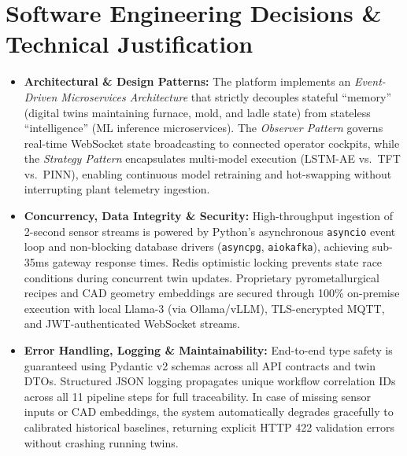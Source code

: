 \documentclass[11pt, a4paper]{article}
\begin{document}
\section{Software Engineering Decisions \& Technical Justification}
\begin{itemize}[noitemsep, topsep=2pt]
    \item \textbf{Architectural \& Design Patterns:} The platform implements an \textit{Event-Driven Microservices Architecture} that strictly decouples stateful ``memory'' (digital twins maintaining furnace, mold, and ladle state) from stateless ``intelligence'' (ML inference microservices). The \textit{Observer Pattern} governs real-time WebSocket state broadcasting to connected operator cockpits, while the \textit{Strategy Pattern} encapsulates multi-model execution (LSTM-AE vs.\ TFT vs.\ PINN), enabling continuous model retraining and hot-swapping without interrupting plant telemetry ingestion.
    \item \textbf{Concurrency, Data Integrity \& Security:} High-throughput ingestion of 2-second sensor streams is powered by Python's asynchronous \texttt{asyncio} event loop and non-blocking database drivers (\texttt{asyncpg}, \texttt{aiokafka}), achieving sub-35ms gateway response times. Redis optimistic locking prevents state race conditions during concurrent twin updates. Proprietary pyrometallurgical recipes and CAD geometry embeddings are secured through 100\% on-premise execution with local Llama-3 (via Ollama/vLLM), TLS-encrypted MQTT, and JWT-authenticated WebSocket streams.
    \item \textbf{Error Handling, Logging \& Maintainability:} End-to-end type safety is guaranteed using Pydantic v2 schemas across all API contracts and twin DTOs. Structured JSON logging propagates unique workflow correlation IDs across all 11 pipeline steps for full traceability. In case of missing sensor inputs or CAD embeddings, the system automatically degrades gracefully to calibrated historical baselines, returning explicit HTTP 422 validation errors without crashing running twins.
\end{itemize}

\end{document}
